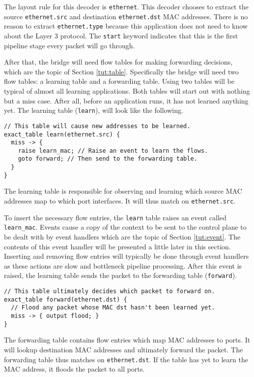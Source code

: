 The layout rule for this decoder is \texttt{ethernet}. This decoder chooses to extract the source \texttt{ethernet.src} and destination \texttt{ethernet.dst} MAC addresses.
There is no reason to extract \texttt{ethernet.type} because this application does not need to know about the Layer 3 protocol. The \texttt{start} keyword indicates that this is the first pipeline stage every packet will go through.

After that, the bridge will need flow tables for making forwarding decisions, which are the topic of Section \ref{tut:table}.
Specifically the bridge will need two flow tables: a learning table and a forwarding table.
Using two tables will be typical of almost all learning applications. Both
tables will start out with nothing but a miss case. After all, before an
application runs, it has not learned anything yet. 
The learning table (\texttt{learn}), will look like the following.

\begin{lstlisting}
// This table will cause new addresses to be learned.
exact_table learn(ethernet.src) {
  miss -> {
  	raise learn_mac; // Raise an event to learn the flows.
    goto forward; // Then send to the forwarding table.
  }
}
\end{lstlisting}

The learning table is responsible for observing and learning which
source MAC addresses map to which port interfaces.
It will thus match on \texttt{ethernet.src}. 

To insert the necessary flow entries, the \texttt{learn} table raises an event
called \texttt{learn\_mac}. 
Events cause a copy of the context to be sent to the control plane to be dealt with by event handlers which are the topic of Section \ref{tut:event}.
The contents of this event handler will be presented a little later in this section.
Inserting and removing flow entries will typically be done through event handlers as these actions are slow and bottleneck pipeline processing.
After this event is raised, the learning table sends the packet to the
forwarding table (\texttt{forward}).

\begin{lstlisting}
// This table ultimately decides which packet to forward on.
exact_table forward(ethernet.dst) {
  // Flood any packet whose MAC dst hasn't been learned yet.
  miss -> { output flood; }
}
\end{lstlisting}

The forwarding table contains flow entries which map MAC addresses to ports. It will lookup destination MAC addresses and ultimately forward the packet. The forwarding table thus
matches on \texttt{ethernet.dst}. If the table has yet to learn the MAC address, it floods the packet to all ports.

